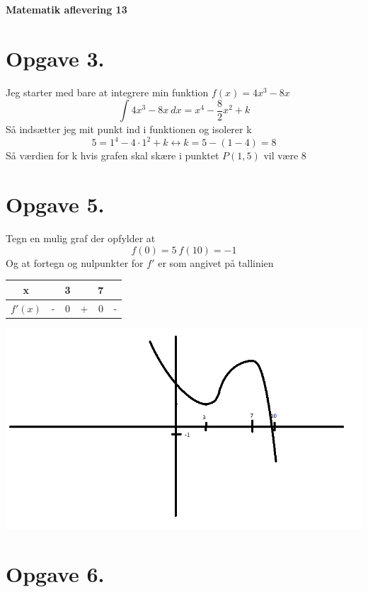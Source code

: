 \documentclass[12pt]{article}
\begin{document}
\Large{\textbf{Matematik aflevering 13}}
\normalsize

\section*{Opgave 3.}
Jeg starter med bare at integrere min funktion $f(x)=4x^3-8x$
$$\int 4x^3-8x \ dx = x^4-\frac{8}{2}x^2+k$$
Så indsætter jeg mit punkt ind i funktionen og isolerer k
$$5=1^4-4 \cdot 1^2+k \leftrightarrow k=5-(1-4)=8$$
Så værdien for k hvis grafen skal skære i punktet $P(1,5)$ vil være $8$

\section*{Opgave 5.}
Tegn en mulig graf der opfylder at
$$f(0)=5 \ f(10)=-1$$
Og at fortegn og nulpunkter for $f'$ er som angivet på tallinien
\begin{center}
  \begin{tabular}{c c c c c c}
    x && 3 && 7 &\\
    \hline
    $f'(x)$ & - & 0 & + & 0 & -
  \end{tabular}
\end{center}
\includegraphics[width=\textwidth]{Graf1mat13.png}

\section*{Opgave 6.}
\end{document}
